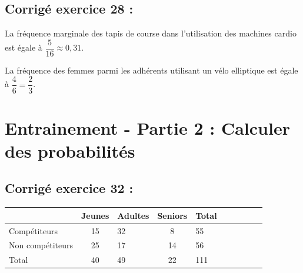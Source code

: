 \documentclass[12pt,a4paper]{book}
\begin{document}
\subsection*{Corrigé exercice 28 :}
\begin{enumMet}
	\item La fréquence marginale des tapis de course dans l'utilisation des machines cardio est égale à $\dfrac{5}{16} \approx 0,31$.
	\item La fréquence des femmes parmi les adhérents utilisant un vélo elliptique est égale à $\dfrac{4}{6}=\dfrac{2}{3}$.	
\end{enumMet}

\section*{Entrainement - Partie 2 : Calculer des probabilités}

\subsection*{Corrigé exercice 32 :}

\begin{center}
	\begin{tabular}{ | Xc | Xc | Xc | Xc | Xc | }
		\hline & Jeunes & Adultes & Seniors & Total\\ \hline
		Compétiteurs & 15 & 32 & 8 & 55\\ \hline
		Non compétiteurs & 25 & 17 & 14 & 56\\ \hline
		Total & 40 & 49 & 22 & 111\\ \hline
	\end{tabular}
\end{center}
\end{document}
